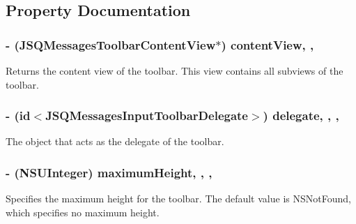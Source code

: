 \subsection{Property Documentation}
\hypertarget{interface_j_s_q_messages_input_toolbar_adc00b5da906c53dc8075cc2a832ba6b4}{}
\subsubsection[{content\+View}]{\setlength{\rightskip}{0pt plus 5cm}-\/ ({\bf J\+S\+Q\+Messages\+Toolbar\+Content\+View}$\ast$) content\+View\hspace{0.3cm}{\ttfamily [read]}, {\ttfamily [nonatomic]}, {\ttfamily [weak]}}\label{interface_j_s_q_messages_input_toolbar_adc00b5da906c53dc8075cc2a832ba6b4}
Returns the content view of the toolbar. This view contains all subviews of the toolbar. \hypertarget{interface_j_s_q_messages_input_toolbar_af65de93b536460ed4bb0a7588f241afd}{}
\subsubsection[{delegate}]{\setlength{\rightskip}{0pt plus 5cm}-\/ (id$<${\bf J\+S\+Q\+Messages\+Input\+Toolbar\+Delegate}$>$) delegate\hspace{0.3cm}{\ttfamily [read]}, {\ttfamily [write]}, {\ttfamily [nonatomic]}, {\ttfamily [weak]}}\label{interface_j_s_q_messages_input_toolbar_af65de93b536460ed4bb0a7588f241afd}
The object that acts as the delegate of the toolbar. \hypertarget{interface_j_s_q_messages_input_toolbar_ae48c9a471d580726838ce52a8bb52f5d}{}
\subsubsection[{maximum\+Height}]{\setlength{\rightskip}{0pt plus 5cm}-\/ (N\+S\+U\+Integer) maximum\+Height\hspace{0.3cm}{\ttfamily [read]}, {\ttfamily [write]}, {\ttfamily [nonatomic]}, {\ttfamily [assign]}}\label{interface_j_s_q_messages_input_toolbar_ae48c9a471d580726838ce52a8bb52f5d}
Specifies the maximum height for the toolbar. The default value is {\ttfamily N\+S\+Not\+Found}, which specifies no maximum height. \hypertarget{interface_j_s_q_messages_input_toolbar_aab6cdb4bf7fc9221c06adb7b18b7c239}{}
